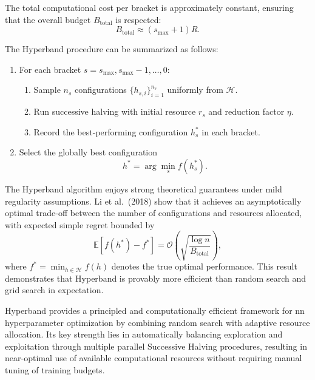 The total computational cost per bracket is approximately constant, ensuring that the overall budget $B_{\text{total}}$ is respected:
\begin{equation}
	B_{\text{total}} \approx (s_{\max} + 1) R.
\end{equation}

The Hyperband procedure can be summarized as follows:
\begin{enumerate}
	\item For each bracket $s = s_{\max}, s_{\max}-1, \ldots, 0$:
	      \begin{enumerate}
		      \item Sample $n_s$ configurations $\{h_{s,i}\}_{i=1}^{n_s}$ uniformly from $\mathcal{H}$.
		      \item Run successive halving with initial resource $r_s$ and reduction factor $\eta$.
		      \item Record the best-performing configuration $h_s^*$ in each bracket.
	      \end{enumerate}
	\item Select the globally best configuration
	      \begin{equation}
		      h^* = \arg\min_{s} f(h_s^*).
	      \end{equation}
\end{enumerate}

The Hyperband algorithm enjoys strong theoretical guarantees under mild regularity assumptions. Li et al.\ (2018) show that it achieves an asymptotically optimal trade-off between the number of configurations and resources allocated, with expected simple regret bounded by
\begin{equation}
	\mathbb{E}\left[f(h^*) - f^*\right] = \mathcal{O}\left(\sqrt{\frac{\log n}{B_{\text{total}}}}\right),
	\label{eq:hyperband_regret}
\end{equation}
where $f^* = \min_{h \in \mathcal{H}} f(h)$ denotes the true optimal performance. This result demonstrates that Hyperband is provably more efficient than random search and grid search in expectation.

Hyperband provides a principled and computationally efficient framework for \ac{nn} hyperparameter optimization by combining random search with adaptive resource allocation. Its key strength lies in automatically balancing exploration and exploitation through multiple parallel Successive Halving procedures, resulting in near-optimal use of available computational resources without requiring manual tuning of training budgets.

